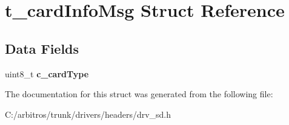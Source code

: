 \hypertarget{structt__card_info_msg}{\section{t\-\_\-card\-Info\-Msg Struct Reference}
\label{structt__card_info_msg}
}
\subsection*{Data Fields}
\begin{DoxyCompactItemize}
\item 
\hypertarget{structt__card_info_msg_ad3bb35301ef17fc663c93a81c374cf78}{uint8\-\_\-t {\bfseries c\-\_\-card\-Type}}\label{structt__card_info_msg_ad3bb35301ef17fc663c93a81c374cf78}

\end{DoxyCompactItemize}


The documentation for this struct was generated from the following file\-:\begin{DoxyCompactItemize}
\item 
C\-:/arbitros/trunk/drivers/headers/drv\-\_\-sd.\-h\end{DoxyCompactItemize}
